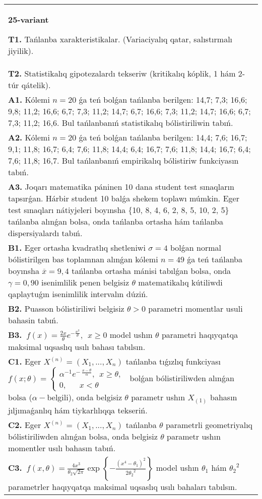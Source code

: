 \documentclass{article}
\begin{document}
\begin{tabular}{m{17cm}}
\textbf{25-variant}
\newline

\textbf{T1.} 
Tańlanba xarakteristikalar. (Variaciyalıq qatar, salıstırmalı jiyilik).
 \\
\textbf{T2.} 
Statistikalıq gipotezalardı tekseriw (kritikalıq kóplik, 1 hám 2-túr qátelik).
 \\
\textbf{A1.} 
Kólemi \(n = 20\) ǵa teń bolǵan tańlanba berilgen: 14,7; 7,3; 16,6; 9,8; 11,2; 16,6; 6,7; 7,3; 11,2; 14,7; 6,7; 16,6; 7,3; 11,2; 14,7; 16,6; 6,7; 7,3; 11,2; 16,6. Bul tańlanbanıń statistikalıq bólistiriliwin tabıń.
 \\
\textbf{A2.} 
Kólemi \(n = 20\) ǵa teń bolǵan tańlanba berilgen: 14,4; 7,6; 16,7; 9,1; 11,8; 16,7; 6,4; 7,6; 11,8; 14,4; 6,4; 16,7; 7,6; 11,8; 14,4; 16,7; 6,4; 7,6; 11,8; 16,7. Bul tańlanbanıń empirikalıq bólistiriw funkciyasın tabıń.
 \\
\textbf{A3.} 
Joqarı matematika páninen 10 dana student test sınaqların tapsırǵan. Hárbir student 10 balǵa shekem toplawı múmkin. Eger test sınaqları nátiyjeleri boyınsha \{10, 8, 4, 6, 2, 8, 5, 10, 2, 5\} tańlanba alınǵan bolsa, onda tańlanba ortasha hám tańlanba dispersiyalardı tabıń.
 \\
\textbf{B1.} 
Eger ortasha kvadratlıq shetleniwi \(\sigma = 4\) bolǵan normal bólistirilgen bas toplamnan alınǵan kólemi \(n = 49\) ǵa teń tańlanba boyınsha \(\overline{x} = 9,4\) tańlanba ortasha mánisi tabılǵan bolsa, onda \(\gamma = 0,90\) isenimlilik penen belgisiz \(\theta\) matematikalıq kútiliwdi qaplaytuǵın isenimlilik intervalın dúziń.
 \\
\textbf{B2.} 
Puasson bólistiriliwi belgisiz \(\theta > 0\) parametri momentlar usuli bahasin tabıń.
 \\
\textbf{B3.} 
\(\ f(x) = \frac{2x}{\theta}e^{- \frac{x^{2}}{\theta}},\ \ x \geq 0\) model ushın \(\theta\) parametri haqıyqatqa maksimal uqsaslıq usılı bahası tabılsın.
 \\
\textbf{C1.} 
Eger \(X^{(n)} = \left( X_{1},...,X_{n} \right)\) tańlanba tıǵızlıq funkciyası
$f(x;\theta) = \left\{ \begin{array}{r}
\alpha^{- 1}e^{- \ \frac{x - \theta}{\alpha}},\ \ x \geq \theta, \\
0,\ \ \ \ \ \ \ x < \theta
\end{array} \right.\ $
bolǵan bólistiriliwden alınǵan bolsa (\(\alpha -\)belgili), onda belgisiz \(\theta\) parametr ushın \(X_{(1)}\) bahasın jıljımaǵanlıq hám tiykarlılıqqa tekseriń.
 \\
\textbf{C2.} 
Eger \(X^{(n)} = \left( X_{1},...,X_{n} \right)\) tańlanba \(\theta\) parametrli geometriyalıq bólistiriliwden alınǵan bolsa, onda belgisiz \(\theta\) parametr ushın momentler usılı bahasın tabıń.
 \\
\textbf{C3.} 
\(\ f(x,\theta) = \frac{4x^{3}}{\theta_{2}\sqrt{2\pi}}\exp\left\{ - \frac{\left( x^{4} - \theta_{1} \right)^{2}}{2{\theta_{2}}^{2}} \right\}\) model ushın \(\theta_{1}\) hám \({\theta_{2}}^{2}\) parametrler haqıyqatqa maksimal uqsaslıq usılı bahaları tabılsın.
 \\

\end{tabular}
\end{document}
